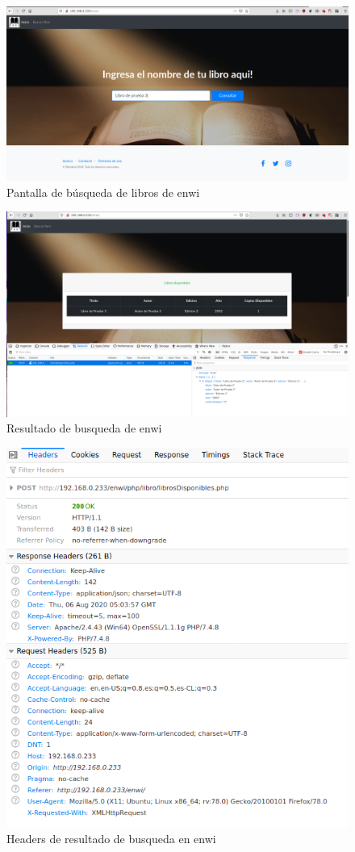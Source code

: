 \begin{figure}
	\centering
	\includegraphics[width=.9\textwidth]{fragments/pentest/app2.png}
    \caption{ Pantalla de búsqueda de libros de enwi }
\end{figure}

\begin{figure}
	\centering
	\includegraphics[width=.9\textwidth]{fragments/pentest/app3.png}
    \caption{ Resultado de busqueda de enwi }
\end{figure}

\begin{figure}
	\centering
	\includegraphics[width=.9\textwidth]{fragments/pentest/app4.png}
    \caption{ Headers de resultado de busqueda en enwi }
\end{figure}


